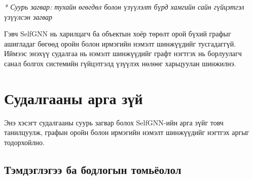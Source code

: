\documentclass[conference]{IEEEtran}
\begin{document}
\begin{table}[h]
\caption{SelfGNN загварын гүйцэтгэлийн харьцуулалт (HR@10, NDCG@10)~\cite{selfgnn2024}}
\label{tab:selfgnn_performance}
\centering

\renewcommand{\arraystretch}{1.3}
\setlength{\tabcolsep}{6pt}


\vspace{2pt}
\begin{flushleft}
\footnotesize{\textit{* Суурь загвар: тухайн өгөгдөл болон үзүүлэлт бүрд хамгийн сайн гүйцэтгэл үзүүлсэн загвар}}
\end{flushleft}

\end{table}

Гэвч SelfGNN нь харилцагч ба объектын хоёр төрөлт орой бүхий графыг ашигладаг бөгөөд оройн болон ирмэгийн нэмэлт шинжүүдийг тусгадаггүй. Иймээс энэхүү судалгаа нь нэмэлт шинжүүдийг графт нэгтгэх нь борлуулагч санал болгох системийн гүйцэтгэлд үзүүлэх нөлөөг харьцуулан шинжилнэ.

\section{Судалгааны арга зүй}

Энэ хэсэгт судалгааны суурь загвар болох SelfGNN-ийн арга зүйг товч танилцуулж, графын оройн болон ирмэгийн нэмэлт шинжүүдийг нэгтгэх аргыг тодорхойлно.

\subsection{Тэмдэглэгээ ба бодлогын томьёолол}
\end{document}
